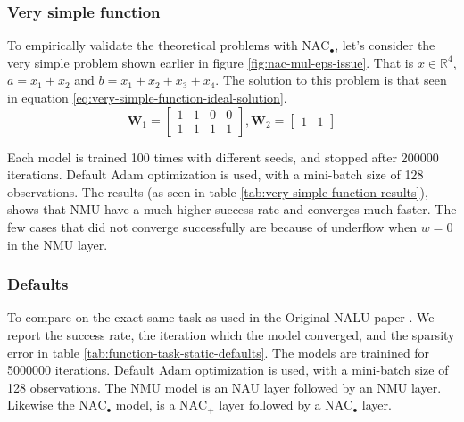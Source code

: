 
\subsubsection{Very simple function}

To empirically validate the theoretical problems with $\mathrm{NAC}_{\bullet}$, let's consider the very simple problem shown earlier in figure \ref{fig:nac-mul-eps-issue}. That is $x \in \mathbb{R}^4$, $a = x_1 + x_2$ and $b = x_1 + x_2 + x_3 + x_4$. The solution to this problem is that seen in equation \ref{eq:very-simple-function-ideal-solution}.
\begin{equation}
    \mathbf{W}_1 = \begin{bmatrix}
    1 & 1 & 0 & 0 \\
    1 & 1 & 1 & 1
    \end{bmatrix}, \mathbf{W}_2 = \begin{bmatrix}
    1 & 1
    \end{bmatrix}
    \label{eq:very-simple-function-ideal-solution}
\end{equation}

Each model is trained 100 times with different seeds, and stopped after 200000 iterations. Default Adam optimization is used, with a mini-batch size of 128 observations. The results (as seen in table \ref{tab:very-simple-function-results}), shows that NMU have a much higher success rate and converges much faster. The few cases that did not converge successfully are because of underflow when $w = 0$ in the NMU layer.



\subsubsection{Defaults}

To compare on the exact same task as used in the Original NALU paper \cite{trask-nalu}. We report the success rate, the iteration which the model converged, and the sparsity error in table \ref{tab:function-task-static-defaults}. The models are trainined for 5000000 iterations. Default Adam optimization is used, with a mini-batch size of 128 observations. The NMU model is an NAU layer followed by an NMU layer. Likewise the  $\mathrm{NAC}_{\bullet}$ model, is a $\mathrm{NAC}_{+}$ layer followed by a $\mathrm{NAC}_{\bullet}$ layer.

